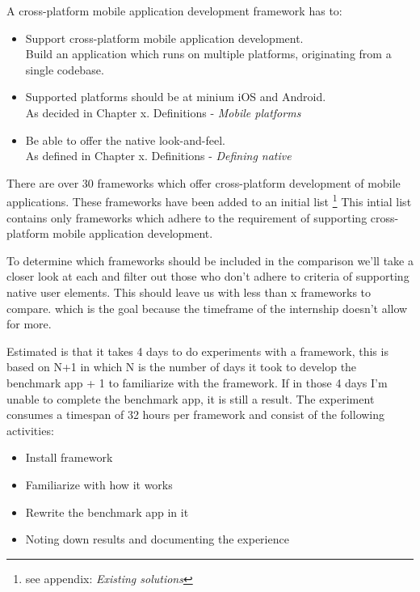 A cross-platform mobile application development framework has to:
\begin{itemize}
\item Support cross-platform mobile application development.\\
Build an application which runs on multiple platforms, originating from a single codebase.
\item Supported platforms should be at minium iOS and Android.\\
As decided in Chapter x. Definitions - \emph{Mobile platforms}
\item Be able to offer the native look-and-feel.\\
As defined in Chapter x. Definitions - \emph{Defining native}
\end{itemize}



There are over 30 frameworks which offer cross-platform development of mobile applications\cite{Wikipedia2012}. These frameworks have been added to an initial list \footnote{see appendix: \emph{Existing solutions}} This intial list contains only frameworks which adhere to the requirement of supporting cross-platform mobile application development.

To determine which frameworks should be included in the comparison we'll take a closer look at each and filter out those who don't adhere to criteria of supporting native user elements. This should leave us with less than x frameworks to compare. which is the goal because the timeframe of the internship doesn't allow for more. 




Estimated is that it takes 4 days to do experiments with a framework, this is based on N+1 in which N is the number of days it took to develop the benchmark app + 1 to familiarize with the framework. If in those 4 days I'm unable to complete the benchmark app, it is still a result. The experiment consumes a timespan of 32 hours per framework and consist of the following activities:

\begin{itemize}
	\item Install framework
	\item Familiarize with how it works
	\item Rewrite the benchmark app in it
	\item Noting down results and documenting the experience
\end{itemize}

